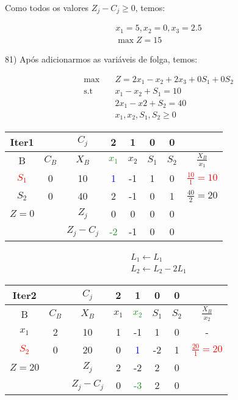 \documentclass[]{article}
\begin{document}
Como todos os valores $Z_j - C_j \geq 0$, temos:

\begin{align*}
    x_1=5, x_2=0, x_3=2.5 \\
    \max Z = 15
\end{align*}

\vspace{0.5cm}

81) Após adicionarmos as variáveis de folga, temos:

\begin{align*}
    \max        &\quad Z = 2x_1 - x_2 + 2x_3 + 0S_1 + 0S_2 \\
    \text{s.t}  &\quad x_1 - x_2 + S_1 = 10 \\
                &\quad 2x_1 - x2 + S_2 = 40 \\
                &\quad x_1, x_2, S_1, S_2 \geq 0
\end{align*}

\begin{center}
 \begin{tabular}{| c | c | c | c | c | c | c | c |} 
 \hline
 Iter1 &   & $C_j$ & 2 & 1 & 0 & 0 &  \\ [0.5ex] 
 \hline
 B & $C_B$ & $X_B$ & \textcolor{ForestGreen}{$x_1$} & $x_2$ & $S_1$ & $S_2$ & $\frac{X_B}{x_1}$ \\ 
 \hline
 \textcolor{red}{$S_1$} & 0 & 10 & \textcolor{blue}{1} & -1 & 1 & 0 & \textcolor{red}{$\frac{10}{1}=10$} \\
 \hline
 $S_2$ & 0 & 40 & 2 & -1 & 0 & 1 & $\frac{40}{2}=20$  \\
 \hline
 $Z=0$ &   & $Z_j$ & 0 & 0 & 0 & 0 &   \\
 \hline
  &   & $Z_j - C_j$ & \textcolor{ForestGreen}{-2} & -1 & 0 & 0 &  \\
 \hline
\end{tabular}
\end{center}

\begin{align*}
    L_1 \leftarrow L_1 \\
    L_2 \leftarrow L_2 - 2L_1
\end{align*}

\begin{center}
 \begin{tabular}{| c | c | c | c | c | c | c | c |} 
 \hline
 Iter2 &   & $C_j$ & 2 & 1 & 0 & 0 &  \\ [0.5ex] 
 \hline
 B & $C_B$ & $X_B$ & $x_1$ & \textcolor{ForestGreen}{$x_2$} & $S_1$ & $S_2$ & $\frac{X_B}{x_2}$ \\ 
 \hline
 $x_1$ & 2 & 10 & 1 & -1 & 1 & 0 & -\\
 \hline
 \textcolor{red}{$S_2$} & 0 & 20 & 0 & \textcolor{blue}{1} & -2 & 1 & \textcolor{red}{$\frac{20}{1}=20$}  \\
 \hline
 $Z=20$ &   & $Z_j$ & 2 & -2 & 2 & 0 &   \\
 \hline
  &   & $Z_j - C_j$ & 0 & \textcolor{ForestGreen}{-3} & 2 & 0 &  \\
 \hline
\end{tabular}
\end{center}
\end{document}
